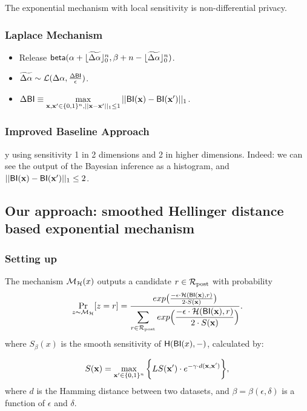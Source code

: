 \documentclass[sigconf]{acmart}
\begin{document}
The exponential mechanism with local sensitivity is non-differential privacy\cite{dwork2014algorithmic}.



\subsubsection{Laplace Mechanism}
\begin{itemize}
  \item Release $\mathsf{beta}(\alpha +  \lfloor\widetilde{\Delta \alpha}\rfloor^n_0,\beta + n - \lfloor\widetilde{\Delta \alpha}\rfloor^n_0)$.
  \item $\widetilde{\Delta \alpha}\sim \mathcal{L}(\Delta\alpha, \frac{\Delta \mathsf{BI}}{\epsilon})$.
  \item $\Delta \mathsf{BI} \equiv \max\limits_{\textbf{x}, \textbf{x}' \in \{0,1\}^{n}, ||\textbf{x} - \textbf{x}'||_1 \leq 1} ||\mathsf{BI}(\textbf{x}) - \mathsf{BI}(\textbf{x}')||_1$.
  \end{itemize}



\subsubsection{Improved Baseline Approach}

y using sensitivity 1 in 2 dimensions and 2 in higher dimensions.
    Indeed: we can see the output of the Bayesian inference as a histogram, and $||\mathsf{BI}(\textbf{x})-\mathsf{BI}(\textbf{x}')||_1 \leq 2$.


\subsection{Our approach: smoothed Hellinger distance based exponential mechanism}
\label{sec_smoo}

\subsubsection{Setting up}

\begin{definition}
\label{def_smoo}
The mechanism $\mathcal{M}_{\mathcal{H}}(x)$ outputs a candidate $r \in \mathcal{R}_{\textup{post}}$ with probability
\begin{equation*}
\underset{z \thicksim \mathcal{M}_{\mathcal{H}}}{\Pr}[z=r] = \frac {exp\big(\frac{-\epsilon\cdot\mathcal{H}(\mathsf{BI}(\textbf{x}),r)}{2\cdot S(\textbf{x})}\big)}
{\displaystyle\sum_{r\in\mathcal{R}_{\textup{post}}} exp\Big(\frac{-\epsilon\cdot\mathcal{H}(\mathsf{BI}(\textbf{x}),r)}{2\cdot S(\textbf{x})}\Big)}.
\end{equation*}
where $S_\beta(x)$ is the smooth sensitivity of $\mathsf{H}(\mathsf{BI}(x),-)$, calculated by:

\begin{equation}
  \label{eq:smooth}
   S(\textbf{x})=\max_{\textbf{x}' \in \{0,1\}^{n}}\bigg \{LS(\textbf{x}') \cdot e^{-\gamma\cdot d(\textbf{x},\textbf{x}')}\bigg\},
\end{equation}
where $d$ is the Hamming distance between two datasets, and $\beta =
\beta(\epsilon, \delta)$ is a function of $\epsilon$ and $\delta$. 
\end{definition}
\end{document}
